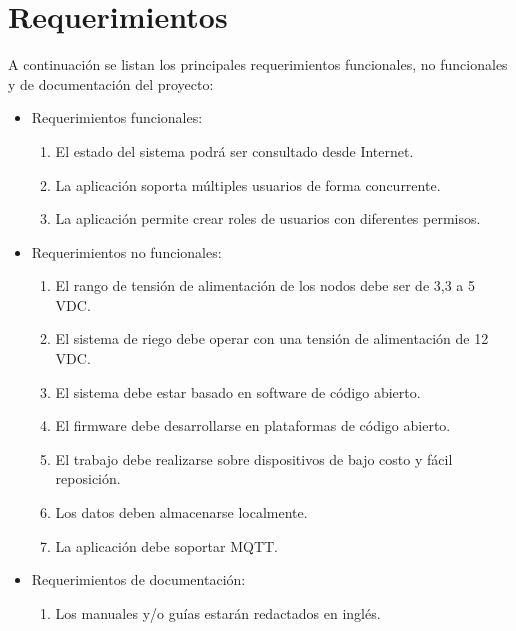 \section{Requerimientos}
\label{sec:Requerimientos}

A continuación se listan los principales requerimientos funcionales,  no funcionales y de documentación del proyecto:

\begin{itemize}
\item Requerimientos funcionales:
\begin{enumerate}

\item El estado del sistema podrá ser consultado desde Internet.
\item La aplicación soporta múltiples usuarios de forma concurrente.
\item La aplicación permite crear roles de usuarios con diferentes permisos.
\end{enumerate}
\end{itemize} 
\begin{itemize}
\item Requerimientos no funcionales:
\begin{enumerate}
\item El rango de tensión de alimentación de los nodos debe ser de 3,3 a 5 VDC.
\item El sistema de riego debe operar con una tensión de alimentación de 12 VDC.
\item El sistema debe estar basado en software de código abierto.
\item El firmware debe desarrollarse en plataformas de código abierto.
\item El trabajo debe realizarse sobre dispositivos de bajo costo y fácil reposición.
\item Los datos deben almacenarse localmente.
\item La aplicación debe soportar MQTT.
\end{enumerate}


\end{itemize} 
\begin{itemize}
\item Requerimientos de documentación:
\begin{enumerate}
\item Los manuales y/o guías estarán redactados en inglés.
\end{enumerate}


\end{itemize}
